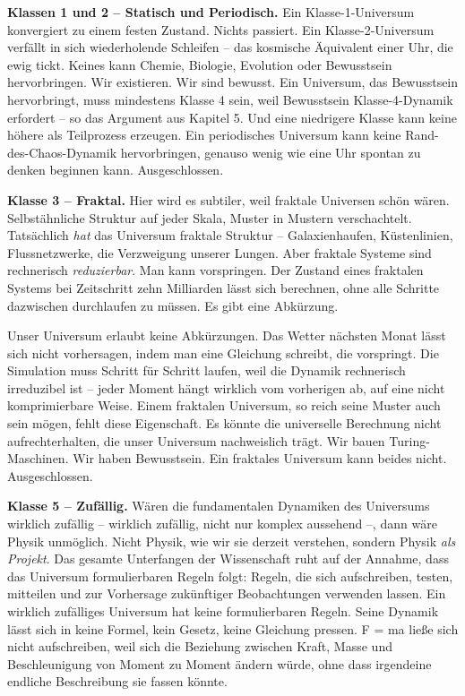 \documentclass[11pt, twoside, openright]{book}
\begin{document}
\textbf{Klassen 1 und 2 -- Statisch und Periodisch.} Ein Klasse-1-Universum konvergiert zu einem festen Zustand. Nichts passiert. Ein Klasse-2-Universum verfällt in sich wiederholende Schleifen -- das kosmische Äquivalent einer Uhr, die ewig tickt. Keines kann Chemie, Biologie, Evolution oder Bewusstsein hervorbringen. Wir existieren. Wir sind bewusst. Ein Universum, das Bewusstsein hervorbringt, muss mindestens Klasse 4 sein, weil Bewusstsein Klasse-4-Dynamik erfordert -- so das Argument aus Kapitel 5. Und eine niedrigere Klasse kann keine höhere als Teilprozess erzeugen. Ein periodisches Universum kann keine Rand-des-Chaos-Dynamik hervorbringen, genauso wenig wie eine Uhr spontan zu denken beginnen kann. Ausgeschlossen.

\textbf{Klasse 3 -- Fraktal.} Hier wird es subtiler, weil fraktale Universen schön wären. Selbstähnliche Struktur auf jeder Skala, Muster in Mustern verschachtelt. Tatsächlich \textit{hat} das Universum fraktale Struktur -- Galaxienhaufen, Küstenlinien, Flussnetzwerke, die Verzweigung unserer Lungen. Aber fraktale Systeme sind rechnerisch \textit{reduzierbar}. Man kann vorspringen. Der Zustand eines fraktalen Systems bei Zeitschritt zehn Milliarden lässt sich berechnen, ohne alle Schritte dazwischen durchlaufen zu müssen. Es gibt eine Abkürzung.

Unser Universum erlaubt keine Abkürzungen. Das Wetter nächsten Monat lässt sich nicht vorhersagen, indem man eine Gleichung schreibt, die vorspringt. Die Simulation muss Schritt für Schritt laufen, weil die Dynamik rechnerisch irreduzibel ist -- jeder Moment hängt wirklich vom vorherigen ab, auf eine nicht komprimierbare Weise. Einem fraktalen Universum, so reich seine Muster auch sein mögen, fehlt diese Eigenschaft. Es könnte die universelle Berechnung nicht aufrechterhalten, die unser Universum nachweislich trägt. Wir bauen Turing-Maschinen. Wir haben Bewusstsein. Ein fraktales Universum kann beides nicht. Ausgeschlossen.

\textbf{Klasse 5 -- Zufällig.} Wären die fundamentalen Dynamiken des Universums wirklich zufällig -- wirklich zufällig, nicht nur komplex aussehend --, dann wäre Physik unmöglich. Nicht Physik, wie wir sie derzeit verstehen, sondern Physik \textit{als Projekt}. Das gesamte Unterfangen der Wissenschaft ruht auf der Annahme, dass das Universum formulierbaren Regeln folgt: Regeln, die sich aufschreiben, testen, mitteilen und zur Vorhersage zukünftiger Beobachtungen verwenden lassen. Ein wirklich zufälliges Universum hat keine formulierbaren Regeln. Seine Dynamik lässt sich in keine Formel, kein Gesetz, keine Gleichung pressen. F = ma ließe sich nicht aufschreiben, weil sich die Beziehung zwischen Kraft, Masse und Beschleunigung von Moment zu Moment ändern würde, ohne dass irgendeine endliche Beschreibung sie fassen könnte.
\end{document}

